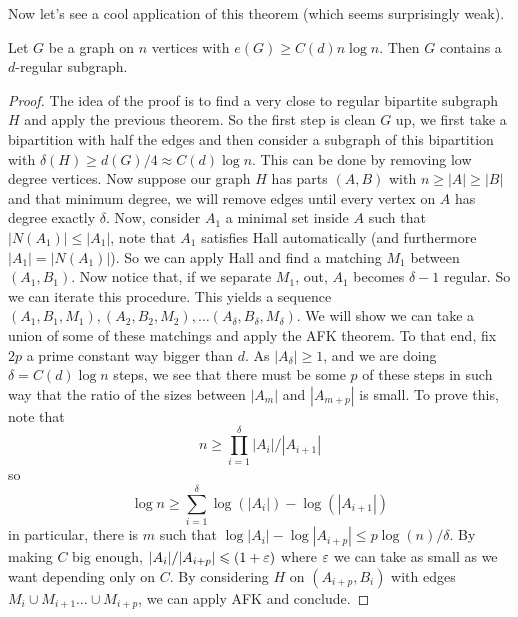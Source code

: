 Now let's see a cool application of this theorem (which seems
surprisingly weak).
\begin{theorem}[Pyber 85]
	Let $G$ be a graph on $n$ vertices with $e(G) \geq C(d)n\log n$.
	Then $G$ contains
	a $d$-regular subgraph.
\end{theorem}
\begin{proof}
	The idea of the proof is to find a very close to regular bipartite
	subgraph $H$ and apply the previous
	theorem. So the first step is clean $G$ up, we first take a
	bipartition with half the edges and then
	consider a subgraph of this bipartition with $\delta(H) \geq d(G)/4
	\approx C(d) \log n$. This can be done by removing low
	degree vertices. Now suppose our graph $H$ has parts $(A, B)$ with
	$n \geq |A| \geq |B|$ and that minimum degree, we will
	remove edges until every vertex on $A$ has degree exactly $\delta$.
	Now, consider $A_1$ a minimal set inside $A$
	such that $|N(A_1)| \leq |A_1|$, note that $A_1$ satisfies Hall
	automatically (and furthermore $|A_1| = |N(A_1)|$).
	So we can apply Hall and find a matching $M_1$ between $(A_1,B_1)$.
	Now notice that, if we separate $M_1$,
	out, $A_1$ becomes $\delta - 1$ regular. So we can iterate this
	procedure. This yields a sequence
	$(A_1,B_1, M_1), (A_2, B_2, M_2), \dots (A_{\delta}, B_{\delta},
	M_{\delta})$. We will show
	we can take a union of some of these matchings and apply the AFK theorem.
	To that end, fix $2p$ a prime constant way bigger than $d$. As
	$|A_{\delta}| \geq 1$,
	and we are doing $\delta = C(d)\log n$ steps, we see that there must
	be some $p$ of these steps
	in such way that the ratio of the sizes  between $|A_{m}|$ and
	$|A_{m + p}|$ is small.
	To prove this, note that
	\[
		n \geq \prod_{i = 1}^\delta |A_i|/|A_{i+1}|
	\]
	so
	\[
		\log n \geq \sum_{i = 1}^{\delta} \log(|A_i|) - \log(|A_{i+1}|)
	\]
	in particular, there is $m$ such that $\log |A_i| - \log |A_{i+p}|
	\leq p\log(n)/\delta$.
	By making $C$ big enough, $|A_{i}|/|A_{i+p}| \leqslant (1 + \varepsilon)$ where
	$\varepsilon$ we can take
	as small as we want depending only on $C$. By considering $H$ on
	$(A_{i+p}, B_i)$
	with edges $M_i \cup M_{i+1} \dots \cup M_{i+p}$, we can apply AFK
	and conclude.
\end{proof}
